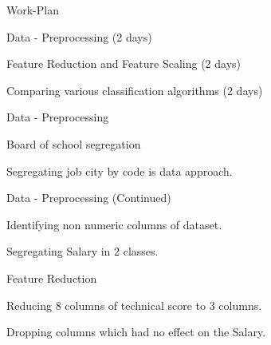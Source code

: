 \documentclass[14pt]{beamer}
\begin{document}
\begin{frame}{Work-Plan}
\pause
 \begin{fullpageitemize}
  \item\begin{center} Data - Preprocessing (2 days) \end{center}
  \item\begin{center} Feature Reduction and Feature Scaling (2 days)\end{center}
  \item\begin{center}Comparing various classification algorithms (2 days) \end{center}
 \end{fullpageitemize}
\end{frame}
\begin{frame}{Data - Preprocessing}
\pause
 \begin{fullpageitemize}
  \item\begin{center}Board of school segregation \end{center}
  \item\begin{center}Segregating job city by code is data approach. \end{center}

 \end{fullpageitemize}
\end{frame}
\begin{frame}{Data - Preprocessing (Continued)}
\pause
 \begin{fullpageitemize}
  \item\begin{center}Identifying non numeric columns of dataset. \end{center}
  \item\begin{center}Segregating Salary in 2 classes. \end{center}
 \end{fullpageitemize}
\end{frame}
\begin{frame}{Feature Reduction}
\pause
 \begin{fullpageitemize}
  \item\begin{center}Reducing 8 columns of  technical score to 3 columns.\end{center}
  \item\begin{center}Dropping columns which had no effect on the Salary. \end{center}
 \end{fullpageitemize}
\end{frame}
\end{document}
